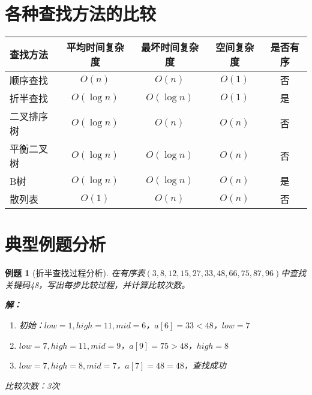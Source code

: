 \documentclass[12pt,a4paper]{amsart}
\newtheorem{example}{例题}[section]
\begin{document}
\section{各种查找方法的比较}

\begin{center}
\begin{tabular}{|l|c|c|c|c|}
\hline
\textbf{查找方法} & \textbf{平均时间复杂度} & \textbf{最坏时间复杂度} & \textbf{空间复杂度} & \textbf{是否有序} \\
\hline
顺序查找 & $O(n)$ & $O(n)$ & $O(1)$ & 否 \\
\hline
折半查找 & $O(\log n)$ & $O(\log n)$ & $O(1)$ & 是 \\
\hline
二叉排序树 & $O(\log n)$ & $O(n)$ & $O(n)$ & 否 \\
\hline
平衡二叉树 & $O(\log n)$ & $O(\log n)$ & $O(n)$ & 否 \\
\hline
B树 & $O(\log n)$ & $O(\log n)$ & $O(n)$ & 是 \\
\hline
散列表 & $O(1)$ & $O(n)$ & $O(n)$ & 否 \\
\hline
\end{tabular}
\end{center}

\section{典型例题分析}

\begin{example}[折半查找过程分析]
在有序表$(3,8,12,15,27,33,48,66,75,87,96)$中查找关键码48，写出每步比较过程，并计算比较次数。

\textbf{解：}
\begin{enumerate}
\item 初始：$low=1, high=11, mid=6$，$a[6]=33 < 48$，$low=7$
\item $low=7, high=11, mid=9$，$a[9]=75 > 48$，$high=8$  
\item $low=7, high=8, mid=7$，$a[7]=48 = 48$，查找成功
\end{enumerate}
比较次数：3次
\end{example}
\end{document}
